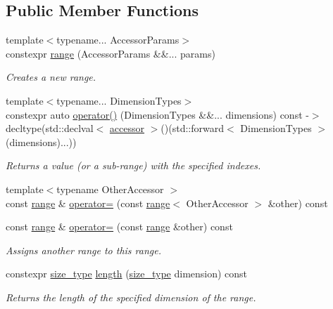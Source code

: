 \subsection*{Public Member Functions}
\begin{DoxyCompactItemize}
\item 
{\footnotesize template$<$typename... Accessor\+Params$>$ }\\constexpr \hyperlink{classgko_1_1range_a906b09927f171491b605dd62e8723d98}{range} (Accessor\+Params \&\&... params)
\begin{DoxyCompactList}\small\item\em Creates a new range. \end{DoxyCompactList}\item 
{\footnotesize template$<$typename... Dimension\+Types$>$ }\\constexpr auto \hyperlink{classgko_1_1range_a3ac230f10fa217dbb46475ea38243573}{operator()} (Dimension\+Types \&\&... dimensions) const -\/$>$ decltype(std\+::declval$<$ \hyperlink{classgko_1_1range_a3332728e51dadcf6517847cef3000a17}{accessor} $>$()(std\+::forward$<$ Dimension\+Types $>$(dimensions)...))
\begin{DoxyCompactList}\small\item\em Returns a value (or a sub-\/range) with the specified indexes. \end{DoxyCompactList}\item 
{\footnotesize template$<$typename Other\+Accessor $>$ }\\const \hyperlink{classgko_1_1range}{range} \& \hyperlink{classgko_1_1range_ab58e7e142727278bfd837dbc6f7d5b51}{operator=} (const \hyperlink{classgko_1_1range}{range}$<$ Other\+Accessor $>$ \&other) const
\item 
const \hyperlink{classgko_1_1range}{range} \& \hyperlink{classgko_1_1range_af3761a7996e353988dea26581f4390aa}{operator=} (const \hyperlink{classgko_1_1range}{range} \&other) const
\begin{DoxyCompactList}\small\item\em Assigns another range to this range. \end{DoxyCompactList}\item 
constexpr \hyperlink{namespacegko_a6e5c95df0ae4e47aab2f604a22d98ee7}{size\+\_\+type} \hyperlink{classgko_1_1range_a3ac8b238c377da9cc05d7c728efabfc8}{length} (\hyperlink{namespacegko_a6e5c95df0ae4e47aab2f604a22d98ee7}{size\+\_\+type} dimension) const
\begin{DoxyCompactList}\small\item\em Returns the length of the specified dimension of the range. \end{DoxyCompactList}\item 

\end{DoxyCompactItemize}
